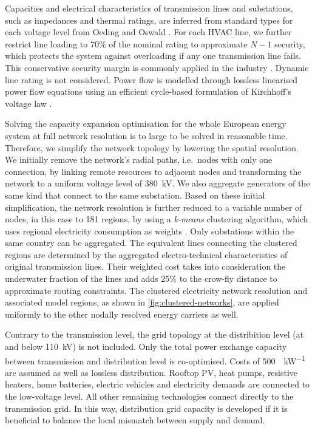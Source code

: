 
Capacities and electrical characteristics of transmission lines and substations,
such as impedances and thermal ratings, are
inferred from standard types for each voltage level from Oeding and Oswald . For each HVAC
line, we further restrict line loading to 70\% of the nominal rating to
approximate $N-1$ security, which protects the system against overloading if any
one transmission line fails. This conservative security margin is commonly
applied in the industry . Dynamic line rating is not considered. Power
flow is modelled through lossless linearised power flow equations using an
efficient cycle-based formulation of Kirchhoff's voltage law .


Solving the capacity expansion optimisation for the whole European energy system
at full network resolution is to large to be solved in reasonable time.
Therefore, we simplify the network topology by lowering the spatial resolution.
We initially remove the network's radial paths, i.e.~nodes with only one
connection, by linking remote resources to adjacent nodes and transforming the
network to a uniform voltage level of \SI{380}{\kilo\volt}. We also aggregate
generators of the same kind that connect to the same substation. Based on these
initial simplification, the network resolution is further reduced to a variable
number of nodes, in this case to 181 regions, by using a \textit{k-means}
clustering algorithm, which uses regional electricity consumption as weights
. Only substations within the
same country can be aggregated. The equivalent lines connecting the clustered
regions are determined by the aggregated electro-technical characteristics of
original transmission lines. Their weighted cost takes into consideration the
underwater fraction of the lines and adds 25\% to the crow-fly distance to
approximate routing constraints. The clustered electricity network resolution
and associated model regions, as shown in \cref{fig:clustered-networks}, are
applied uniformly to the other nodally resolved energy carriers as well.


Contrary to the transmission level, the grid topology at the distribition level
(at and below \SI{110}{\kilo\volt}) is not included. Only the total power
exchange capacity between transmission and distribution level is co-optimised.
Costs of \SI{500}{\sieuro\per\kilo\watt} are assumed as well as lossless
distribution. Rooftop PV, heat pumps, resistive heaters, home batteries,
electric vehicles and electricity demands are connected to the low-voltage
level. All other remaining technologies connect directly to the transmission
grid. In this way, distribution grid capacity is developed if it is beneficial
to balance the local mismatch between supply and demand.